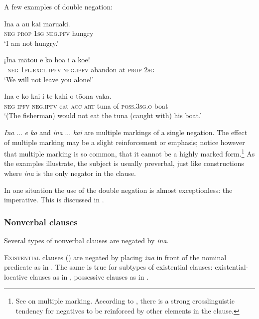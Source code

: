 A few examples of double negation:

\ea\label{ex:10.104}
\gll {\ꞌ}Ina a au kai maruaki. \\
\textsc{neg} \textsc{prop} \textsc{1sg} \textsc{neg.pfv} hungry \\

\glt 
‘I am not hungry.’ \textstyleExampleref{[R208.250]} 
\z

\ea\label{ex:10.105}
\gll ¡{\ꞌ}Ina mātou e ko hoa i a koe! \\
~\textsc{neg} \textsc{1pl.excl} \textsc{ipfv} \textsc{neg.ipfv} abandon at \textsc{prop} \textsc{2sg} \\

\glt 
‘We will not leave you alone!’ \textstyleExampleref{[MsE-028.012]}
\z

\ea\label{ex:10.106}
\gll {\ꞌ}Ina e ko kai i te kahi o tō{\ꞌ}ona vaka. \\
\textsc{neg} \textsc{ipfv} \textsc{neg.ipfv} eat \textsc{acc} \textsc{art} tuna of \textsc{poss.3sg.o} boat \\

\glt
‘(The fisherman) would not eat the tuna (caught with) his boat.’ \textstyleExampleref{[Ley-5-27.013]}
\z

\textit{{\ꞌ}Ina} ... \textit{e ko} and \textit{{\ꞌ}ina} ... \textit{kai} are multiple markings of a single negation. The effect of multiple marking may be a slight reinforcement or emphasis; notice however that multiple marking is so common, that it cannot be a highly marked form.\footnote{\label{fn:493}See \citet[91]{Dixon2012} on multiple marking. According to \citet[224]{Payne1985}, there is a strong crosslinguistic tendency for negatives to be reinforced by other elements in the clause.}  As the examples illustrate, the subject is usually preverbal, just like constructions where \textit{{\ꞌ}ina} is the only negator in the clause.

In one situation the use of the double negation is almost exceptionless: the imperative. This is discussed in .

\subsubsection{Nonverbal clauses}\label{sec:10.5.1.2}

Several types of nonverbal clauses are negated by \textit{{\ꞌ}ina}.

\textsc{Existential} clauses () are negated by placing \textit{{\ꞌ}ina} in front of the nominal predicate as in . The same is true for subtypes of existential clauses: existential-locative clauses as in , possessive clauses as in . 

